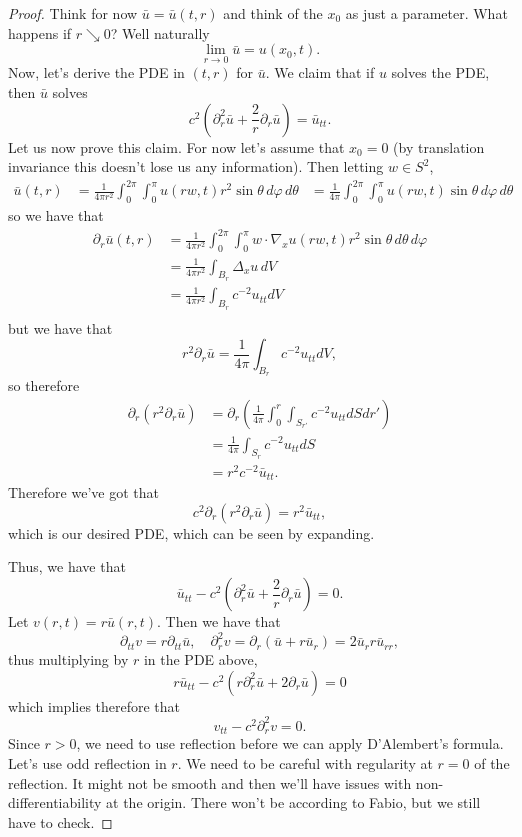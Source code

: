 \begin{proof}
	Think for now \( \bar u = \bar u(t, r) \) and think of the \( x_{0} \) as just a parameter. What happens if \( r \searrow 0 \)? Well naturally
	\[ \lim_{r \to 0} \bar u = u(x_{0}, t). \]
	Now, let's derive the PDE in \( (t, r) \) for \( \bar u \). We claim that if \( u \) solves the PDE, then \( \bar u \) solves
	\[ c^{2} \left( \partial^{2}_{r} \bar u + \frac{2}{r}\partial_{r} \bar u \right) = \bar u_{t t}. \]
	Let us now prove this claim. For now let's assume that \( x_{0} = 0 \) (by translation invariance this doesn't lose us any information). Then letting \( w \in S^{2} \),
	\begin{align*}
	\bar u(t, r) &= \frac{1}{4 \pi r^{2}} \int_{0}^{2 \pi} \int_{0}^{\pi} u(r w, t) r^{2} \sin \theta \, d \varphi \, d \theta
	&= \frac{1}{4 \pi} \int_{0}^{2 \pi} \int_{0}^{\pi} u(r w, t) \sin \theta \, d \varphi \, d \theta
	\end{align*}
	so we have that
	\begin{align*}
		\partial_{r} \bar u(t, r) &=  \frac{1}{4 \pi r^{2}} \int_{0}^{2 \pi} \int_{0}^{\pi} w \cdot \nabla_{x} u \left( r w, t \right)  r^{2} \sin \theta \, d \theta \, d \varphi \\
															&= \frac{1}{4 \pi r^{2}} \int_{B_{r}} \Delta_{x}u \, dV \\
															&= \frac{1}{4 \pi r^{2}} \int_{B_{r}} c^{-2}u_{t t} dV \\
	\end{align*}
	but we have that
	\[ r^{2} \partial_{r} \bar u = \frac{1}{4 \pi} \int_{B_{r}} c^{-2} u_{t t} dV, \]
	so therefore
	\begin{align*}
		\partial_{r} \left( r^{2} \partial_{r} \bar u \right) &= \partial_{r} \left( \frac{1}{4 \pi} \int_{0}^{r} \int_{S_{r'}} c^{-2} u_{t t} dS dr'  \right) \\
																													&= \frac{1}{4 \pi} \int_{S_{r}} c^{-2} u_{t t} dS \\
																													&= r^{2} c^{-2} \bar u_{t t}.
	\end{align*}
	Therefore we've got that
	\[ c^{2} \partial_{r} \left( r^{2} \partial_{r} \bar u \right) = r^{2} \bar u_{t t}, \]
	which is our desired PDE, which can be seen by expanding.

	Thus, we have that
	\[ \bar u_{t t} - c^{2} \left( \partial^{2}_{r} \bar u + \frac{2}{r} \partial_{r} \bar u \right) = 0. \]
	Let \( v(r, t) = r \bar u(r, t) \). Then we have that
	\[ \partial_{t t} v = r \partial_{t t} \bar u, \quad \partial^{2}_{r} v = \partial_{r} \left( \bar u + r \bar u_{r} \right) = 2 \bar u_{r} r \bar u_{r r}, \]
	thus multiplying by \( r \) in the PDE above,
	\[ r \bar u_{t t} - c^{2} \left( r \partial_{r}^{2} \bar u + 2 \partial_{r} \bar u \right) = 0 \]
	which implies therefore that
	\[ v_{t t} - c^{2} \partial_{r}^{2} v = 0. \]
	Since \( r > 0 \), we need to use reflection before we can apply D'Alembert's formula. Let's use odd reflection in \( r \). We need to be careful with regularity at \( r = 0 \) of the reflection. It might not be smooth and then we'll have issues with non-differentiability at the origin. There won't be according to Fabio, but we still have to check. 


\end{proof}
